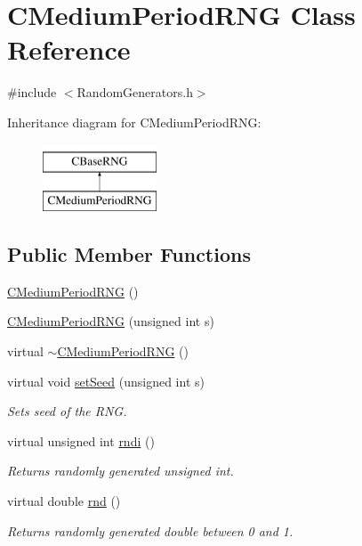 \hypertarget{class_c_medium_period_r_n_g}{\section{C\-Medium\-Period\-R\-N\-G Class Reference}
\label{class_c_medium_period_r_n_g}
}


{\ttfamily \#include $<$Random\-Generators.\-h$>$}

Inheritance diagram for C\-Medium\-Period\-R\-N\-G\-:\begin{figure}[H]
\begin{center}
\leavevmode
\includegraphics[height=2.000000cm]{class_c_medium_period_r_n_g}
\end{center}
\end{figure}
\subsection*{Public Member Functions}
\begin{DoxyCompactItemize}
\item 
\hyperlink{class_c_medium_period_r_n_g_aba95f9e5dcb09e40c95801d404819c40}{C\-Medium\-Period\-R\-N\-G} ()
\item 
\hyperlink{class_c_medium_period_r_n_g_a26abf9707201f8ca9bbb4643970546ac}{C\-Medium\-Period\-R\-N\-G} (unsigned int s)
\item 
virtual \hyperlink{class_c_medium_period_r_n_g_a7a115251a984445fa5e2f5a8d8bda0af}{$\sim$\-C\-Medium\-Period\-R\-N\-G} ()
\item 
virtual void \hyperlink{class_c_medium_period_r_n_g_a8f0a3aebcea30b879719d9af1ac548e1}{set\-Seed} (unsigned int s)
\begin{DoxyCompactList}\small\item\em Sets seed of the R\-N\-G. \end{DoxyCompactList}\item 
virtual unsigned int \hyperlink{class_c_medium_period_r_n_g_a12611a6c74a312860cccfbdb2bdbf89e}{rndi} ()
\begin{DoxyCompactList}\small\item\em Returns randomly generated unsigned int. \end{DoxyCompactList}\item 
virtual double \hyperlink{class_c_medium_period_r_n_g_a56a6e5751b8563b56c30f5c1d0351eec}{rnd} ()
\begin{DoxyCompactList}\small\item\em Returns randomly generated double between 0 and 1. \end{DoxyCompactList}\end{DoxyCompactItemize}
